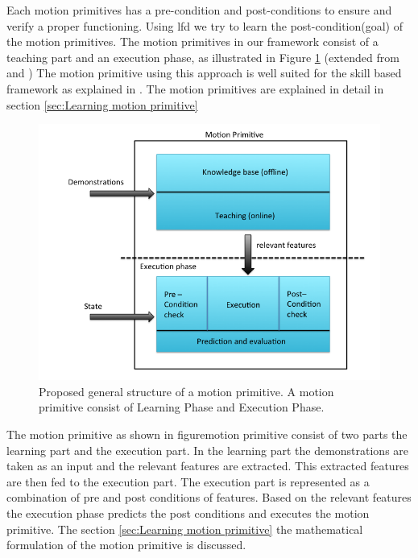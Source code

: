Each motion primitives has a pre-condition and post-conditions to ensure and verify a proper
functioning. Using \acrshort{lfd} we try to learn the post-condition(goal) of the motion primitives. The
motion primitives in our framework consist of a teaching part and an execution phase, as
illustrated in Figure \ref{motion primitive} (extended from \cite{bogh_does_2012} and \cite{andersen_using_2014})
The motion primitive using this approach is well suited for the skill
based framework as explained in \cite{pedersen_robot_2015}. The motion primitives 
are explained in detail in section \ref{sec:Learning motion primitive}
\begin{figure}[htp] \centering
    \includegraphics[scale=0.5]{images/motion_primitive_color.png}
    \caption[General structure of a motion primitive]{Proposed general
    structure of a motion primitive. A motion primitive consist of Learning
Phase and Execution Phase.} \label{motion primitive} \end{figure}

The motion primitive as shown in figure{motion primitive} consist of two parts 
the learning part and the execution part.
In the learning part the demonstrations are taken as an input and the relevant features are 
extracted. This extracted features are then fed to the execution part.
The execution part is represented as a combination of pre and post conditions of features.
Based on the relevant features the execution phase predicts the post conditions 
and executes  the motion primitive.
The section \ref{sec:Learning motion primitive} the mathematical formulation of the 
motion primitive is discussed.

